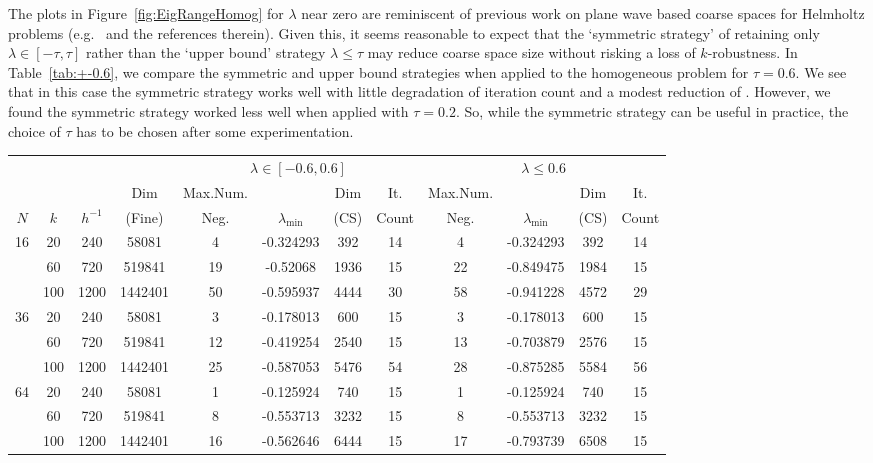 \documentclass[numbers,webpdf,imaiai]{ima-authoring-template}%
\theoremstyle{thmstyletwo}%
\numberwithin{equation}{section}
\numberwithin{equation}{section}
\begin{document}
{The plots in Figure~\ref{fig:EigRangeHomog} for $\lambda$ near zero are reminiscent of previous work 
on plane wave based coarse spaces for Helmholtz problems (e.g.\ \cite{KiSa:07} and the references therein). 
Given this, it seems reasonable to expect that the `symmetric strategy' of retaining only $\lambda \in [-\tau, \tau]$ 
rather than the `upper bound' strategy  $\lambda \le \tau$ may reduce coarse space size without risking a loss of $k$-robustness.
In Table~\ref{tab:+-0.6}, we compare the symmetric and upper bound strategies when  
applied to the homogeneous problem for $\tau = 0.6$.  We see that in this case the symmetric strategy works well 
with little degradation of iteration count and a modest reduction of . 
However, we found the symmetric strategy worked less well when applied with $\tau = 0.2$. 
So, while the symmetric strategy can be useful in practice, the choice of $\tau$ has to be chosen 
after some  experimentation.
\begin{table}[h!]
    \centering
    \scriptsize
    \begin{tabular}{cccc|cccc|cccc}
 & & & &\multicolumn{4}{c|}{$\lambda \in [-0.6,0.6]$} & \multicolumn{4}{c}{$\lambda \leq 0.6$} \\
 &  &  & Dim & Max.Num. &  & Dim & It. & Max.Num. &  & Dim & It.  \\
$N$ & $k$ & $h^{-1}$ & (Fine) & Neg. & $\lambda_\text{min}$ & (CS) & Count & Neg. & $\lambda_\text{min}$ & (CS) & Count \\
\hline
16 & 20 & 240 & 58081 & 4 & -0.324293 & 392 & 14 & 4 & -0.324293 & 392 & 14 \\
 & 60 & 720 & 519841 & 19 & -0.52068 & 1936 & 15 & 22 & -0.849475 & 1984 & 15 \\
 & 100 & 1200 & 1442401 & 50 & -0.595937 & 4444 & 30 & 58 & -0.941228 & 4572 & 29 \\
\hline
36 & 20 & 240 & 58081 & 3 & -0.178013 & 600 & 15 & 3 & -0.178013 & 600 & 15 \\
 & 60 & 720 & 519841 & 12 & -0.419254 & 2540 & 15 & 13 & -0.703879 & 2576 & 15 \\
 & 100 & 1200 & 1442401 & 25 & -0.587053 & 5476 & 54 & 28 & -0.875285 & 5584 & 56 \\
\hline
64 & 20 & 240 & 58081 & 1 & -0.125924 & 740 & 15 & 1 & -0.125924 & 740 & 15 \\
 & 60 & 720 & 519841 & 8 & -0.553713 & 3232 & 15 & 8 & -0.553713 & 3232 & 15 \\
 & 100 & 1200 & 1442401 & 16 & -0.562646 & 6444 & 15 & 17 & -0.793739 & 6508 & 15 \\

\end{tabular}
\end{table}}
\end{document}
